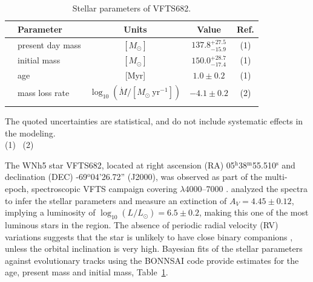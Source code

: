 \documentclass[a4paper,fleqn,usenatbib]{mnras}
\DeclareRobustCommand{\Tabref}[1]{Table~\ref{#1}}
\begin{document}
\begin{table}
  \begin{center}
    \caption{Stellar parameters of VFTS682. }
    \begin{tabular}{llc|c|c}
      \hline
      \hline
      &Parameter & Units & Value & Ref.\\
     
       \hline
     & present day mass  & $[M_\odot]$ & $137.8^{+27.5}_
                                           {-15.9}$ & (1)
                                                    \\
      & initial mass& $[M_\odot]$ & $150.0^{+28.7}_{-17.4}$ & (1)
      \\
      &age & [Myr] & $1.0\pm0.2$ & (1) \\
      & mass loss rate & $\log_{10}(\dot{M}/[M_\odot \ \mathrm{yr}^{-1}])$ & $-4.1\pm0.2$ & (2)\\
      \hline
      \label{tab:star_param}
    \end{tabular}
      The quoted uncertainties are statistical, and do not include systematic
      effects in the modeling.\\
      (1)~\cite{schneider:18}
      (2)~\cite{bestenlehner:11}
  \end{center}
\end{table}



The WNh5 star VFTS682, located at right ascension (RA)
05$^\mathrm{h}$38$^\mathrm{m}$55.510$^\mathrm{s}$  and declination
(DEC) \mbox{-69$^\mathrm{o}$04'26.72''} (J2000), was observed as part of the multi-epoch, spectroscopic VFTS campaign covering $\lambda$4000--7000 \citep[][]{evans:11}. 
\citet{bestenlehner:11}  analyzed the spectra to infer the stellar
parameters and measure an extinction of $A_V=4.45\pm0.12$, implying a
luminosity of $\log_{10}(L/L_\odot) =  6.5\pm0.2$, making this one of
the most luminous stars in the region. The absence of periodic radial
velocity (RV)
variations suggests that the star is unlikely to have close binary
companions \citep[][]{bestenlehner:11}, unless the orbital inclination is
very high. Bayesian fits of the stellar
parameters against evolutionary tracks \citep{brott:11, kohler:15}
using the BONNSAI code \citep{schneider:14,schneider:17} provide
estimates for the age, present mass and initial mass, %
\Tabref{tab:star_param}. %
\end{document}
